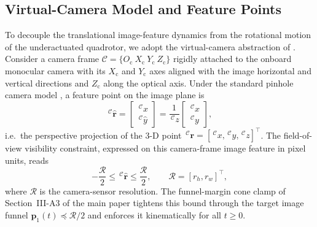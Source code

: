 \documentclass[10pt,journal]{IEEEtran}
\begin{document}
\subsection{Virtual-Camera Model and Feature Points}
\label{sup:virtual_features}
To decouple the translational image-feature dynamics from the rotational motion of the underactuated quadrotor, we adopt the virtual-camera abstraction of \cite{fink2017, xie2016_2}. Consider a camera frame $\mathcal{C}=\{O_{\text{c}}~X_{\text{c}}~Y_{\text{c}}~Z_{\text{c}}\}$ rigidly attached to the onboard monocular camera with its $X_{\text{c}}$ and $Y_{\text{c}}$ axes aligned with the image horizontal and vertical directions and $Z_{\text{c}}$ along the optical axis. Under the standard pinhole camera model \cite{chaumette2006}, a feature point on the image plane is
\begin{equation}
\label{sup:pinhole camera model}
    \,^\mathcal{C}\boldsymbol{\hat{r}} = \begin{bmatrix} \,^\mathcal{C}\hat{x} \\ \,^\mathcal{C}\hat{y} \end{bmatrix}
    = \frac{1}{\,^\mathcal{C}z}\begin{bmatrix} \,^\mathcal{C}x \\ \,^\mathcal{C}y \end{bmatrix},
\end{equation}
i.e.\ the perspective projection of the 3-D point $\,^\mathcal{C}\boldsymbol{r}=[\,^\mathcal{C}x,\,^\mathcal{C}y,\,^\mathcal{C}z]^{\top}$. The field-of-view visibility constraint, expressed on this camera-frame image feature in pixel units, reads
\begin{equation} \label{sup:visibility_constraints}
    -\frac{\mathcal{R}}{2} \le \,^\mathcal{C}\hat{\boldsymbol{r}} \le \frac{\mathcal{R}}{2},\qquad \mathcal{R}=[r_h,r_w]^\top,
\end{equation}
where $\mathcal{R}$ is the camera-sensor resolution. The funnel-margin cone clamp of Section~III-A3 of the main paper tightens this bound through the target image funnel $\boldsymbol{p}_1(t)\preceq\mathcal{R}/2$ and enforces it kinematically for all $t\ge 0$.
\end{document}
